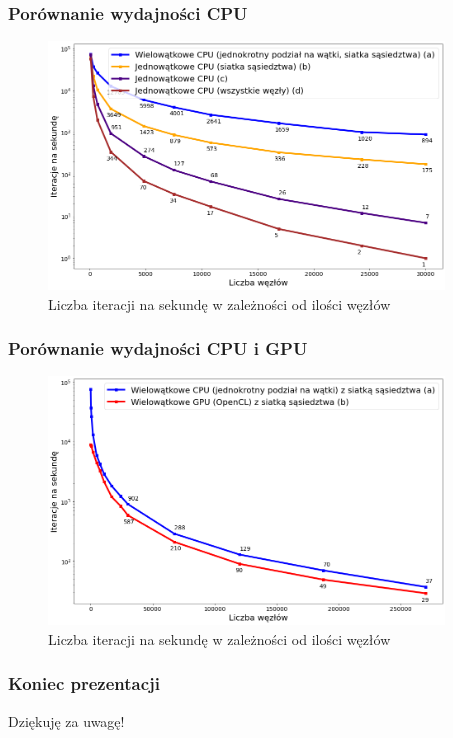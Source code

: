 \documentclass{beamer}
\begin{document}
\begin{frame}
    \frametitle{Porównanie wydajności CPU}

    \begin{figure}[H]
        \centering
        \includegraphics[width=10.5cm]{performance_all_best_worst.png}
        \caption{
            Liczba iteracji na sekundę w zależności od ilości węzłów
        }
    \end{figure}
\end{frame}

\begin{frame}
    \frametitle{Porównanie wydajności CPU i GPU}

    \begin{figure}[H]
        \centering
        \includegraphics[width=10.5cm]{performance_best_cpu_gpu.png}
        \caption{
            Liczba iteracji na sekundę w zależności od ilości węzłów
        }
    \end{figure}
\end{frame}

\begin{frame}
    \frametitle{Koniec prezentacji}

    \centering
    \LARGE Dziękuję za uwagę!
\end{frame}
\end{document}
